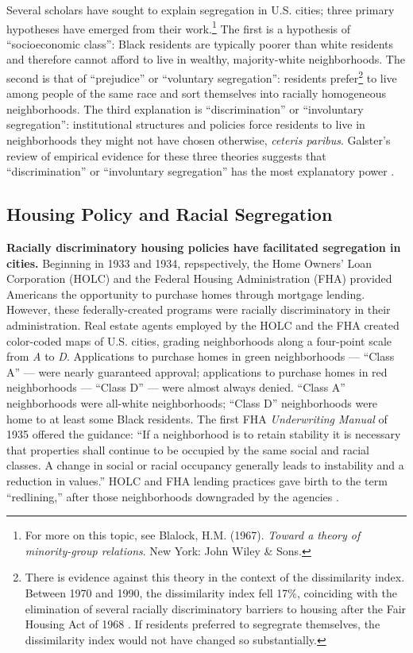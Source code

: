 \documentclass[paper=letter, fontsize=12pt]{scrartcl} %
\begin{document}
	Several scholars have sought to explain segregation in U.S. cities; three primary hypotheses have emerged from their work.\footnote{For more on this topic, see Blalock, H.M. (1967). \textit{Toward a theory of minority-group relations}. New York: John Wiley \& Sons.} The first is a hypothesis of ``socioeconomic class'': Black residents are typically poorer than white residents and therefore cannot afford to live in wealthy, majority-white neighborhoods. The second is that of ``prejudice'' or ``voluntary segregation'': residents prefer\footnote{There is evidence against this theory in the context of the dissimilarity index. Between 1970 and 1990, the dissimilarity index fell 17\%, coinciding with the elimination of several racially discriminatory barriers to housing after the Fair Housing Act of 1968 \cite{goering2}. If residents preferred to segregrate themselves, the dissimilarity index would not have changed so substantially.} to live among people of the same race and sort themselves into racially homogeneous neighborhoods. The third explanation is ``discrimination'' or ``involuntary segregation'': institutional structures and policies force residents to live in neighborhoods they might not have chosen otherwise, \textit{ceteris paribus}. Galster's review of empirical evidence for these three theories suggests that ``discrimination'' or ``involuntary segregation'' has the most explanatory power \cite{goering}.
	
	\subsection{Housing Policy and Racial Segregation}
	\textbf{Racially discriminatory housing policies have facilitated segregation in cities.} Beginning in 1933 and 1934, repspectively, the Home Owners' Loan Corporation (HOLC) and the Federal Housing Administration (FHA) provided Americans the opportunity to purchase homes through mortgage lending. However, these federally-created programs were racially discriminatory in their administration. Real estate agents employed by the HOLC and the FHA created color-coded maps of U.S. cities, grading neighborhoods along a four-point scale from \textit{A} to \textit{D}. Applications to purchase homes in green neighborhoods --- ``Class A'' --- were nearly guaranteed approval; applications to purchase homes in red neighborhoods --- ``Class D'' --- were almost always denied. ``Class A'' neighborhoods were all-white neighborhoods; ``Class D'' neighborhoods were home to at least some Black residents. The first FHA \textit{Underwriting Manual} of 1935 offered the guidance: ``If a neighborhood is to retain stability it is necessary that properties shall continue to be occupied by the same social and racial classes. A change in social or racial occupancy generally leads to instability and a reduction in values.'' \cite{rothstein} HOLC and FHA lending practices gave birth to the term ``redlining,'' after those neighborhoods downgraded by the agencies \cite{rothstein}.\par
	
\end{document}
